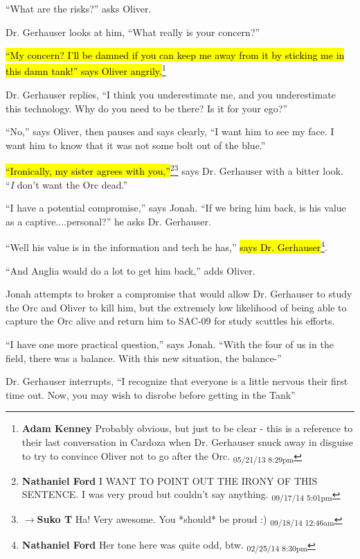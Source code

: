 ``What are the risks?'' asks Oliver.

Dr. Gerhauser looks at him, ``What really is your concern?''

\hl{``My concern?  I'll be damned if you can keep me away from it by sticking me in this damn tank!'' says Oliver angrily.}\footnote{\textbf{Adam Kenney }Probably obvious, but just to be clear - this is a reference to their last conversation in Cardoza when Dr. Gerhauser snuck away in disguise to try to convince Oliver not to go after the Orc. \textsubscript{05/21/13 8:29pm}}

Dr. Gerhauser replies, ``I think you underestimate me, and you underestimate this technology. Why do you need to be there?  Is it for your ego?''

``No,'' says Oliver, then pauses and says clearly, ``I want him to see my face.  I want him to know that it was not some bolt out of the blue.''

\hl{``Ironically, my sister agrees with you,''}\footnote{\textbf{Nathaniel Ford }I WANT TO POINT OUT THE IRONY OF THIS SENTENCE. I was very proud but couldn't say anything. \textsubscript{09/17/14 5:01pm}}\footnote{$\rightarrow$\textbf{Suko T }Ha!  Very awesome. You *should* be proud :) \textsubscript{09/18/14 12:46am}} says Dr. Gerhauser with a bitter look.  ``\textit{I} don't want the Orc dead.''

``I have a potential compromise,'' says Jonah.  ``If we bring him back, is his value as a captive....personal?'' he asks Dr. Gerhauser.

``Well his value is in the information and tech he has,'' \hl{says Dr. Gerhauser}\footnote{\textbf{Nathaniel Ford }Her tone here was quite odd, btw. \textsubscript{02/25/14 8:30pm}}.

``And Anglia would do a lot to get him back,'' adds Oliver.

Jonah attempts to broker a compromise that would allow Dr. Gerhauser to study the Orc and Oliver to kill him, but the extremely low likelihood of being able to capture the Orc alive and return him to SAC-09 for study scuttles his efforts.



``I have one more practical question,'' says Jonah.  ``With the four of us in the field, there was a balance.  With this new situation, the balance-''

Dr. Gerhauser interrupts, ``I recognize that everyone is a little nervous their first time out.  Now, you may wish to disrobe before getting in the Tank''



